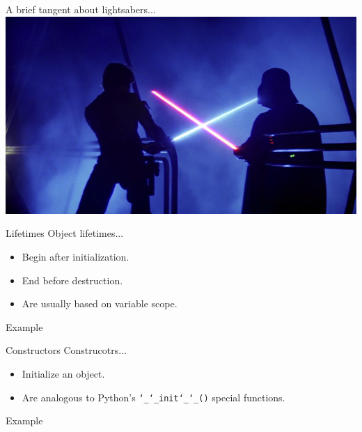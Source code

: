 \documentclass{beamer}
\begin{document}
	\begin{frame}
		\begin{center}
			A brief tangent about lightsabers...
			\includegraphics[width=\textwidth]{images/lightsabers}
		\end{center}
	\end{frame}
	
	
	\begin{frame}{Lifetimes}
		Object lifetimes...
		\begin{itemize}
			\item Begin after initialization.
			\item End before destruction.
			\item Are usually based on variable scope.
		\end{itemize}
		\bigskip
		\begin{exampleblock}{Example}
			\lstI
		\end{exampleblock}
	\end{frame}
	
	
	\begin{frame}{Constructors}
		Construcotrs...
		\begin{itemize}
			\item Initialize an object.
			\item Are analogous to Python's \texttt{\char`_\char`_init\char`_\char`_()} special functions.
		\end{itemize}
		\bigskip
		\begin{exampleblock}{Example}
			\lstI
		\end{exampleblock}
	\end{frame}
	
\end{document}

